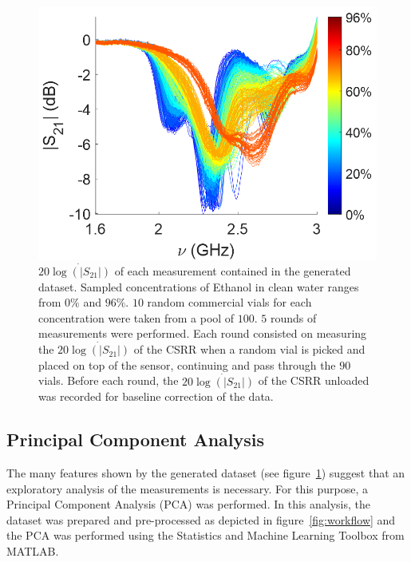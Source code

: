 \documentclass[journal,twoside,web]{ieeecolor}
\begin{document}
\begin{figure}[!t]
	\centering
	\includegraphics [trim = 0mm 0mm 0mm 0mm, clip, width=1\columnwidth]{figures/fig4_3.png}
	\caption{$20\dot{\log\left(|S_{21}|\right)}$ of each measurement contained in the generated dataset. Sampled concentrations of Ethanol in clean water ranges from $0\%$ and $96\%$. $10$ random commercial vials for each concentration were taken from a pool of $100$. $5$ rounds of measurements were performed. Each round consisted on measuring the $20\dot{\log\left(|S_{21}|\right)}$ of the CSRR when a random vial is picked and placed on top of the sensor, continuing and pass through the $90$ vials. Before each round, the $20\dot{\log\left(|S_{21}|\right)}$ of the CSRR unloaded was recorded for baseline correction of the data.}
	\label{fig:mlMeasTaken}
	\vspace{-0.3cm}
\end{figure}

\subsection{Principal Component Analysis}
\label{ssec:pcaAnalysis}

The many features shown by the generated dataset (see figure~\ref{fig:mlMeasTaken}) suggest that an exploratory analysis of the measurements is necessary. For this purpose, a Principal Component Analysis (PCA) was performed. In this analysis, the dataset was prepared and pre-processed as depicted in figure~\ref{fig:workflow} and the PCA was performed using the Statistics and Machine Learning Toolbox from MATLAB.
\end{document}
